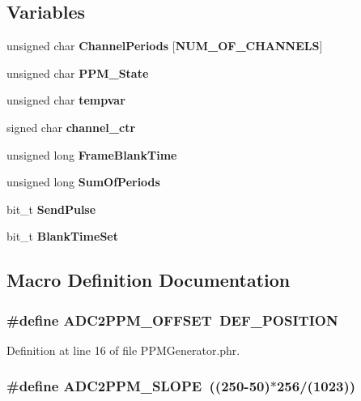 \subsection*{Variables}
\begin{DoxyCompactItemize}
\item 
unsigned char {\bf Channel\-Periods} [{\bf N\-U\-M\-\_\-\-O\-F\-\_\-\-C\-H\-A\-N\-N\-E\-L\-S}]
\item 
unsigned char {\bf P\-P\-M\-\_\-\-State}
\item 
unsigned char {\bf tempvar}
\item 
signed char {\bf channel\-\_\-ctr}
\item 
unsigned long {\bf Frame\-Blank\-Time}
\item 
unsigned long {\bf Sum\-Of\-Periods}
\item 
bit\-\_\-t {\bf Send\-Pulse}
\item 
bit\-\_\-t {\bf Blank\-Time\-Set}
\end{DoxyCompactItemize}


\subsection{Macro Definition Documentation}
\subsubsection[{A\-D\-C2\-P\-P\-M\-\_\-\-O\-F\-F\-S\-E\-T}]{\setlength{\rightskip}{0pt plus 5cm}\#define A\-D\-C2\-P\-P\-M\-\_\-\-O\-F\-F\-S\-E\-T~{\bf D\-E\-F\-\_\-\-P\-O\-S\-I\-T\-I\-O\-N}}\label{_p_p_m_generator_8phr_a2cc1354c38c7cae0cc329cdff853f61f}


Definition at line 16 of file P\-P\-M\-Generator.\-phr.

\subsubsection[{A\-D\-C2\-P\-P\-M\-\_\-\-S\-L\-O\-P\-E}]{\setlength{\rightskip}{0pt plus 5cm}\#define A\-D\-C2\-P\-P\-M\-\_\-\-S\-L\-O\-P\-E~((250-\/50)$\ast$256/(1023))}\label{_p_p_m_generator_8phr_a4a43ae11482e27b37fc46cea0b99a22a}


